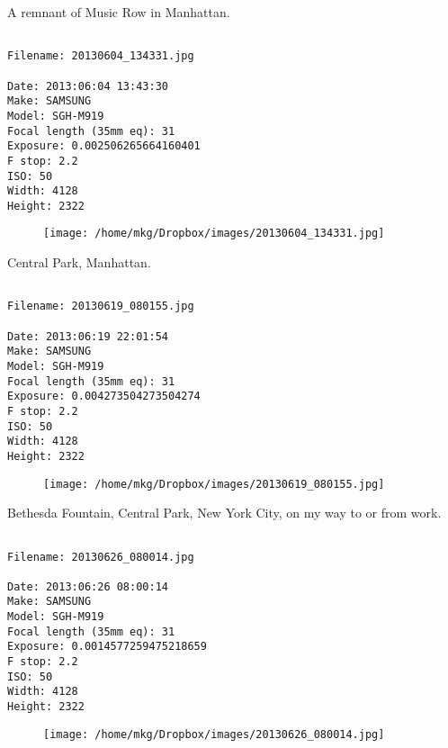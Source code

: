 \clearpage
\onecolumn
\noindent A remnant of Music Row in Manhattan.
\noindent
\begin{lstlisting}

Filename: 20130604_134331.jpg

Date: 2013:06:04 13:43:30
Make: SAMSUNG
Model: SGH-M919
Focal length (35mm eq): 31
Exposure: 0.002506265664160401
F stop: 2.2
ISO: 50
Width: 4128
Height: 2322
\end{lstlisting}
\clearpage

\begin{figure}
\texttt{[image: /home/mkg/Dropbox/images/20130604\_134331.jpg]}
\end{figure}
    
\clearpage
\onecolumn
\noindent Central Park, Manhattan.
\noindent
\begin{lstlisting}

Filename: 20130619_080155.jpg

Date: 2013:06:19 22:01:54
Make: SAMSUNG
Model: SGH-M919
Focal length (35mm eq): 31
Exposure: 0.004273504273504274
F stop: 2.2
ISO: 50
Width: 4128
Height: 2322
\end{lstlisting}
\clearpage

\begin{figure}
\texttt{[image: /home/mkg/Dropbox/images/20130619\_080155.jpg]}
\end{figure}
    
\clearpage
\onecolumn
\noindent Bethesda Fountain, Central Park, New York City, on my way to or from work.
\noindent
\begin{lstlisting}

Filename: 20130626_080014.jpg

Date: 2013:06:26 08:00:14
Make: SAMSUNG
Model: SGH-M919
Focal length (35mm eq): 31
Exposure: 0.0014577259475218659
F stop: 2.2
ISO: 50
Width: 4128
Height: 2322
\end{lstlisting}
\clearpage

\begin{figure}
\texttt{[image: /home/mkg/Dropbox/images/20130626\_080014.jpg]}
\end{figure}
    

